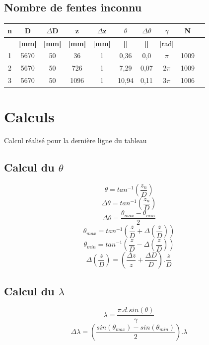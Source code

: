 \documentclass[11pt,a4paper]{report}
\begin{document}
	\subsection{Nombre de fentes inconnu}
	\begin{center}	
	\begin{tabular}{|c|c|c|c|c|c|c|c|c|c|}
		\hline
		\bf n & \bf D & \bf $\Delta$D & \bf z & \bf $\Delta$z & \bf $\theta$ & \bf $\Delta \theta$ &\bf $\gamma$ & N\\
		\hline
		 & \bf [mm] & \bf [mm] & \bf [mm] & \bf [mm] & \bf [\degre]  & \bf [\degre]  & [rad] &\\
		\hline
		1 & 5670 & 50 & 36 &   1&0,36& 0,0 &$\pi$&1009\\
		2 & 5670 & 50 & 726 &  1&7,29& 0,07&$2\pi$&1009\\
		3 & 5670 & 50 & 1096 &  1&10,94&0,11 &$3\pi$&1006\\
		\hline
	\end{tabular}
	\end{center}
	\section{Calculs}
	Calcul réalisé pour la dernière ligne du tableau
	\subsection{Calcul du $\theta$}
	\begin{equation}
	\theta = tan^{-1}\left(\frac{z_{n}}{D}\right) 
	\end{equation}
	\begin{equation}
	\Delta \theta = tan^{-1}\left(\frac{z_{n}}{D}\right) 
	\end{equation}
	\begin{equation}
\Delta\theta=\frac{\theta_{max}-\theta_{min}}{2}
	\end{equation}
	\begin{equation}
	\theta_{max} = tan^{-1}\left(\frac{z}{D}+\Delta\left(\frac{z}{D}\right)\right)
	\end{equation}
	\begin{equation}
	\theta_{min} = tan^{-1}\left(\frac{z}{D}-\Delta\left(\frac{z}{D}\right)\right)
	\end{equation}
	\begin{equation}
	\Delta\left(\frac{z}{D}\right)=\left(\frac{\Delta z}{z}+\frac{\Delta D}{D}\right).\frac{z}{D}
	\end{equation}
	\subsection{Calcul du $\lambda$}
	\begin{equation}
	\lambda = \frac{\pi.d.sin(\theta)}{\gamma}
	\end{equation}
	\begin{equation}
	\Delta \lambda = \left(\frac{sin(\theta_{max})-sin(\theta_{min})}{2}\right) . \lambda
	\end{equation}
\end{document}
